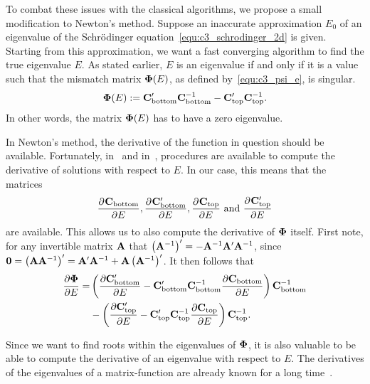 To combat these issues with the classical algorithms, we propose a small modification to Newton's method. Suppose an inaccurate approximation $E_0$ of an eigenvalue of the Schrödinger equation~\eqref{equ:c3_schrodinger_2d} is given. Starting from this approximation, we want a fast converging algorithm to find the true eigenvalue $E$. As stated earlier, $E$ is an eigenvalue if and only if it is a value such that the mismatch matrix $\vb{\Phi}(E)$, as defined by~\eqref{equ:c3_psi_e}, is singular.
$$
  \vb{\Phi}(E) := \vb{C}_\text{bottom}'\vb{C}_\text{bottom}^{-1} - \vb{C}_\text{top}'\vb{C}_\text{top}^{-1}\text{.}
$$
In other words, the matrix $\vb{\Phi}(E)$ has to have a zero eigenvalue.

In Newton's method, the derivative of the function in question should be available. Fortunately, in~\cite{ixaru_lilix_2002} and in~\cite{ledoux_cpmp_2006}, procedures are available to compute the derivative of solutions with respect to $E$. In our case, this means that the matrices
$$
  \pdv[]{\vb{C}_\text{bottom}}{E}, \pdv[]{\vb{C}_\text{bottom}'}{E}, \pdv[]{\vb{C}_\text{top}}{E} \text{ and } \pdv[]{\vb{C}_\text{top}'}{E}
$$
are available. This allows us to also compute the derivative of $\vb{\Phi}$ itself. First note, for any invertible matrix $\vb{A}$ that $\left(\vb{A}^{-1}\right)' = -\vb{A}^{-1} \vb{A}' \vb{A}^{-1}$, since $\vb{0} = \left(\vb{A}\vb{A}^{-1}\right)' = \vb{A}' \vb{A}^{-1} + \vb{A} \left(\vb{A}^{-1}\right)'$. It then follows that
\begin{align*}
  \pdv{\vb{\Phi}}{E} = & \left(\pdv{\vb{C}_\text{bottom}'}{E} - \vb{C}_\text{bottom}'\vb{C}_\text{bottom}^{-1}\pdv{\vb{C}_\text{bottom}}{E}\right) \vb{C}_\text{bottom}^{-1} \\
                       & - \left(\pdv{\vb{C}_\text{top}'}{E} - \vb{C}_\text{top}'\vb{C}_\text{top}^{-1}\pdv{\vb{C}_\text{top}}{E}\right) \vb{C}_\text{top}^{-1}\text{.}
\end{align*}

Since we want to find roots within the eigenvalues of $\vb{\Phi}$, it is also valuable to be able to compute the derivative of an eigenvalue with respect to $E$. The derivatives of the eigenvalues of a matrix-function are already known for a long time~\cite{lancaster_eigenvalues_1964}.


